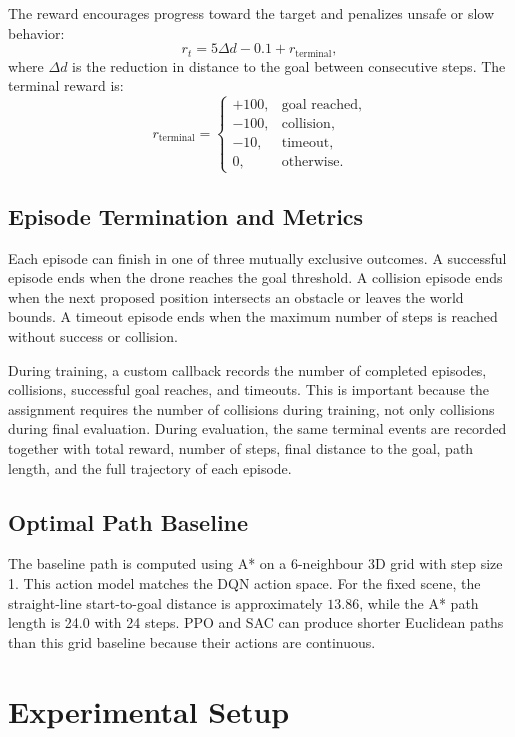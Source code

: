 \documentclass[conference]{IEEEtran}
\begin{document}
The reward encourages progress toward the target and penalizes unsafe or slow
behavior:
\begin{equation}
r_t = 5 \Delta d - 0.1 + r_{\mathrm{terminal}},
\end{equation}
where $\Delta d$ is the reduction in distance to the goal between consecutive
steps. The terminal reward is:
\[
r_{\mathrm{terminal}} =
\begin{cases}
+100, & \text{goal reached},\\
-100, & \text{collision},\\
-10, & \text{timeout},\\
0, & \text{otherwise}.
\end{cases}
\]

\subsection{Episode Termination and Metrics}

Each episode can finish in one of three mutually exclusive outcomes. A
successful episode ends when the drone reaches the goal threshold. A collision
episode ends when the next proposed position intersects an obstacle or leaves
the world bounds. A timeout episode ends when the maximum number of steps is
reached without success or collision.

During training, a custom callback records the number of completed episodes,
collisions, successful goal reaches, and timeouts. This is important because
the assignment requires the number of collisions during training, not only
collisions during final evaluation. During evaluation, the same terminal events
are recorded together with total reward, number of steps, final distance to the
goal, path length, and the full trajectory of each episode.

\subsection{Optimal Path Baseline}

The baseline path is computed using A* \cite{hart1968astar} on a 6-neighbour
3D grid with step size 1. This action model matches the DQN action space. For
the fixed scene, the straight-line start-to-goal distance is approximately
$13.86$, while the A* path length is 24.0 with 24 steps. PPO and SAC can
produce shorter Euclidean paths than this grid baseline because their actions
are continuous.

\section{Experimental Setup}
\end{document}

